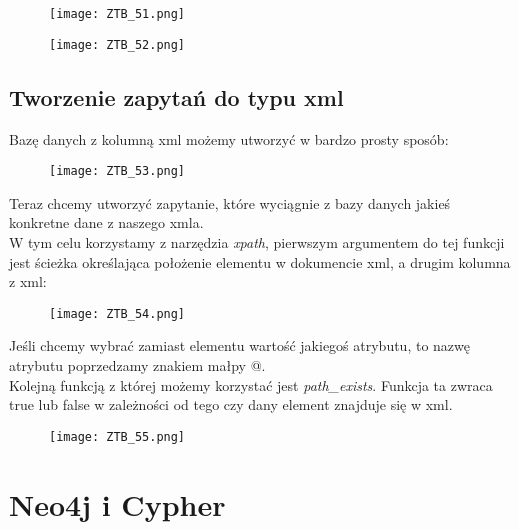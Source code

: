 \documentclass[a4paper,15pt]{article}
\newcommand{\example}[2]{
    \begin{tcolorbox}[colback=blue!5!white,colframe=blue,title={Przykład #1}]
        #2
    \end{tcolorbox}
}
\begin{document}
\example{}{
\begin{figure}[H]
\centering
  \texttt{[image: ZTB\_51.png]}
\end{figure}
\begin{figure}[H]
\centering
  \texttt{[image: ZTB\_52.png]}
\end{figure}
}

\subsection{Tworzenie zapytań do typu xml}

Bazę danych z kolumną xml możemy utworzyć w bardzo prosty sposób:
\begin{figure}[H]
\centering
  \texttt{[image: ZTB\_53.png]}
\end{figure}

Teraz chcemy utworzyć zapytanie, które wyciągnie z bazy danych jakieś konkretne dane z naszego xmla. \\

W tym celu korzystamy z narzędzia \textit{xpath}, pierwszym argumentem do tej funkcji jest ścieżka określająca położenie elementu w dokumencie xml, a drugim kolumna z xml:

\example{}{
\begin{figure}[H]
\centering
  \texttt{[image: ZTB\_54.png]}
\end{figure}
}

Jeśli chcemy wybrać zamiast elementu wartość jakiegoś atrybutu, to nazwę atrybutu poprzedzamy znakiem małpy @.  \\

Kolejną funkcją z której możemy korzystać jest \textit{path\_exists}. Funkcja ta zwraca true lub false w zależności od tego czy dany element znajduje się w xml.

\example{}{
\begin{figure}[H]
\centering
  \texttt{[image: ZTB\_55.png]}
\end{figure}
}




\newpage
\section{Neo4j i Cypher}
\end{document}
